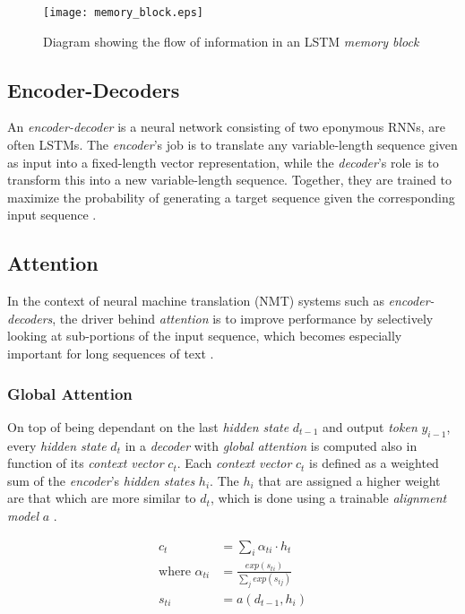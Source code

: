 \begin{figure}[H]
\centering
\texttt{[image: memory\_block.eps]}
\caption{\cite{graves_hybrid_2013} Diagram showing the flow of information in an LSTM \textit{memory block}}
\label{fig:memory_block}
\end{figure}

\subsection{Encoder-Decoders}

An \textit{encoder-decoder} is a neural network consisting of two eponymous RNNs, are often LSTMs. The \textit{encoder}'s job is to translate any variable-length sequence given as input into a fixed-length vector representation, while the \textit{decoder}'s role is to transform this into a new variable-length sequence. Together, they are trained to maximize the probability of generating a target sequence given the corresponding input sequence \cite{cho_learning_2014}.

\subsection{Attention}

In the context of neural machine translation (NMT) systems such as \textit{encoder-decoders}, the driver behind \textit{attention} is to improve performance by selectively looking at sub-portions of the input sequence, which becomes especially important for long sequences of text \cite{yao_dual_2018}.

\subsubsection{Global Attention}

On top of being dependant on the last \textit{hidden state} $d_{t-1}$ and output \textit{token} $y_{i-1}$, every \textit{hidden state} $d_t$ in a \textit{decoder} with \textit{global attention} is computed also in function of its \textit{context vector} $c_t$. Each \textit{context vector} $c_t$ is defined as a weighted sum of the \textit{encoder}'s \textit{hidden states} $h_i$. The $h_i$ that are assigned a higher weight are that which are more similar to $d_t$, which is done using a trainable \textit{alignment model} $a$ \cite{bahdanau_neural_2016}.

\begin{equation}
\begin{aligned}
c_t &= \sum_{i} \alpha_{ti} \cdot h_t \\
\mbox{where } \alpha_{ti} &= \frac{exp(s_{ti})}{\sum_{j} exp(s_{tj})} \\
s_{ti} &= a(d_{t-1},h_i)
\end{aligned}
\end{equation}

